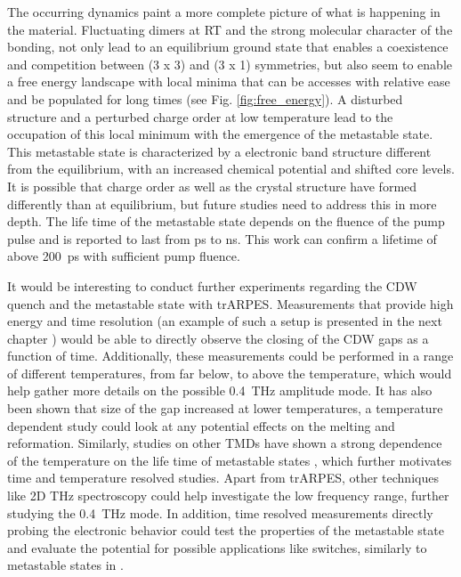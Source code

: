 The occurring dynamics paint a more complete picture of what is happening in the material.
Fluctuating  dimers at RT and the strong molecular character of the bonding, not only lead to an equilibrium ground state that enables a coexistence and competition between (3 x 3) and (3 x 1) symmetries, but also seem to enable a free energy landscape with local minima that can be accesses with relative ease and be populated for long times (see Fig. \ref{fig:free_energy}).
A disturbed structure and a perturbed charge order at low temperature lead to the occupation of this local minimum with the emergence of the metastable state.
This metastable state is characterized by a electronic band structure different from the equilibrium, with an increased chemical potential and shifted core levels.
It is possible that charge order as well as the crystal structure have formed differently than at equilibrium, but future studies need to address this in more depth.
The life time of the metastable state depends on the fluence of the pump pulse and is reported to last from \unit{\pico\second} to \unit{\nano\second}.
This work can confirm a lifetime of above \qty{200}{\pico\second} with sufficient pump fluence.

It would be interesting to conduct further experiments regarding the CDW quench and the metastable state with trARPES.
Measurements that provide high energy and time resolution (an example of such a setup is presented in the next chapter \cite{hellbruck_high-resolution_2024}) would be able to directly observe the closing of the CDW gaps as a function of time.
Additionally, these measurements could be performed in a range of different temperatures, from far below, to above the temperature, which would help gather more details on the possible \qty{0.4}{\tera\hertz} amplitude mode.
It has also been shown \cite{lin_evidence_2022} that size of the gap increased at lower temperatures, a temperature dependent study could look at any potential effects on the melting and reformation.
Similarly, studies on other TMDs have shown a strong dependence of the temperature on the life time of metastable states \cite{stojchevska_ultrafast_2014, vaskivskyi_controlling_2015}, which further motivates time and temperature resolved studies.
Apart from trARPES, other techniques like 2D \unit{\tera\hertz} spectroscopy could help investigate the low frequency range, further studying the \qty{0.4}{\tera\hertz} mode.
In addition, time resolved measurements directly probing the electronic behavior could test the properties of the metastable state and evaluate the potential for possible applications like switches, similarly to metastable states in  \cite{vaskivskyi_controlling_2015}.
